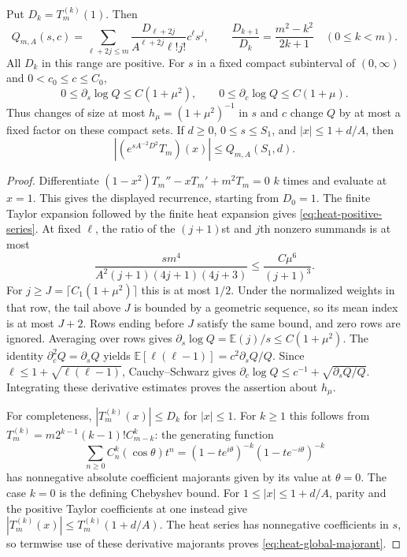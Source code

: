 \begin{lemma}\label{lem:heat-terminal}
Put $D_k=T_m^{(k)}(1)$.  Then
\begin{equation}\label{eq:heat-positive-series}
 Q_{m,A}(s,c)=\sum_{\ell+2j\le m}
 \frac{D_{\ell+2j}}{A^{\ell+2j}\ell!j!}c^\ell s^j,
 \qquad
 \frac{D_{k+1}}{D_k}=\frac{m^2-k^2}{2k+1}\quad(0\le k<m).
\end{equation}
All $D_k$ in this range are positive.  For $s$ in a fixed compact
subinterval of $(0,\infty)$ and $0<c_0\le c\le C_0$,
\begin{equation}\label{eq:heat-log-derivatives}
 0\le\partial_s\log Q\le C(1+\mu^2),\qquad
 0\le\partial_c\log Q\le C(1+\mu).
\end{equation}
Thus changes of size at most $h_\mu=(1+\mu^2)^{-1}$ in $s$ and $c$
change $Q$ by at most a fixed factor on these compact sets.
If $d\ge0$, $0\le s\le S_1$, and $|x|\le1+d/A$, then
\begin{equation}\label{eq:heat-global-majorant}
 \left|\left(e^{sA^{-2}D^2}T_m\right)(x)\right|
 \le Q_{m,A}(S_1,d).
\end{equation}
\end{lemma}

\begin{proof}
Differentiate $(1-x^2)T_m''-xT_m'+m^2T_m=0$ $k$ times and evaluate
at $x=1$.  This gives the displayed recurrence, starting from $D_0=1$.
The finite Taylor expansion followed by the finite heat expansion gives
\eqref{eq:heat-positive-series}.  At fixed $\ell$, the ratio of the
$(j+1)$st and $j$th nonzero summands is at most
\[
 \frac{s m^4}{A^2(j+1)(4j+1)(4j+3)}
 \le\frac{C\mu^6}{(j+1)^3}.
\]
For $j\ge J=\lceil C_1(1+\mu^2)\rceil$ this is at most $1/2$.
Under the normalized weights in that row, the tail above $J$ is bounded
by a geometric sequence, so its mean index is at most $J+2$.
Rows ending before $J$ satisfy the same bound, and zero rows are ignored.
Averaging over rows gives
$\partial_s\log Q=\mathbb E(j)/s\le C(1+\mu^2)$.
The identity $\partial_c^2Q=\partial_sQ$ yields
$\mathbb E[\ell(\ell-1)]=c^2\partial_sQ/Q$.
Since $\ell\le1+\sqrt{\ell(\ell-1)}$, Cauchy--Schwarz gives
$\partial_c\log Q\le c^{-1}+\sqrt{\partial_sQ/Q}$.
Integrating these derivative estimates proves the assertion about
$h_\mu$.

For completeness, $|T_m^{(k)}(x)|\le D_k$ for $|x|\le1$.
For $k\ge1$ this follows from
$T_m^{(k)}=m2^{k-1}(k-1)!C_{m-k}^{k}$: the generating function
\[
 \sum_{n\ge0}C_n^k(\cos\theta)t^n
 =(1-te^{i\theta})^{-k}(1-te^{-i\theta})^{-k}
\]
has nonnegative absolute coefficient majorants given by its value at
$\theta=0$.  The case $k=0$ is the defining Chebyshev bound.
For $1\le|x|\le1+d/A$, parity and the positive Taylor coefficients at
one instead give
$|T_m^{(k)}(x)|\le T_m^{(k)}(1+d/A)$.
The heat series has nonnegative coefficients in $s$, so termwise use of
these derivative majorants proves \eqref{eq:heat-global-majorant}.
\end{proof}

